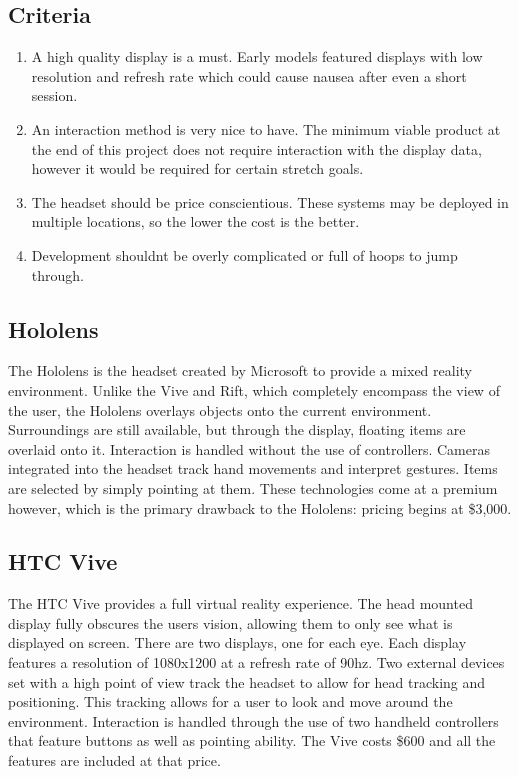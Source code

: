 \documentclass[letterpaper,10pt,onecolumn]{IEEEtran}
\begin{document}
  \subsection {Criteria}
    \begin{enumerate}
      \item A high quality display is a must. Early models featured displays with low resolution and refresh rate which could cause nausea after even a short session.
      \item An interaction method is very nice to have. The minimum viable product at the end of this project does not require interaction with the display data, however it would be required for certain stretch goals.
      \item The headset should be price conscientious. These systems may be deployed in multiple locations, so the lower the cost is the better.
      \item Development shouldn\textsc\textquotesingle t be overly complicated or full of hoops to jump through.
    \end{enumerate}

  \subsection {Hololens}
    The Hololens is the headset created by Microsoft to provide a mixed reality environment. Unlike the Vive and Rift, which completely encompass the view of the user, the Hololens overlays objects onto the current environment. Surroundings are still available, but through the display, floating items are overlaid onto it. Interaction is handled without the use of controllers. Cameras integrated into the headset track hand movements and interpret gestures. Items are selected by simply pointing at them. These technologies come at a premium however, which is the primary drawback to the Hololens: pricing begins at \$3,000. \cite{hololens}
  \subsection {HTC Vive}
    The HTC Vive provides a full virtual reality experience. The head mounted display fully obscures the user\textsc\textquotesingle s vision, allowing them to only see what is displayed on screen. There are two displays, one for each eye. Each display features a resolution of 1080x1200 at a refresh rate of 90hz. Two external devices set with a high point of view track the headset to allow for head tracking and positioning. This tracking allows for a user to look and move around the environment. Interaction is handled through the use of two handheld controllers that feature buttons as well as pointing ability. The Vive costs \$600 and all the features are included at that price. \cite{vive}
\end{document}
